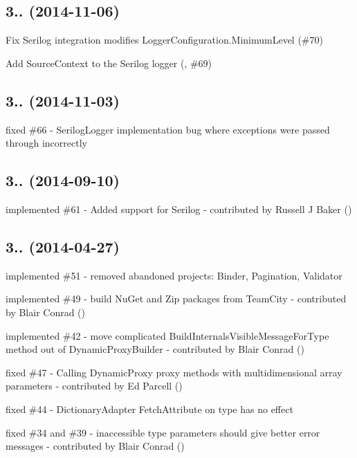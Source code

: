 \subsection*{3.. (2014-\/11-\/06)}


\begin{DoxyItemize}
\item Fix Serilog integration modifies Logger\+Configuration.\+Minimum\+Level (\#70)
\item Add Source\+Context to the Serilog logger (, \#69)
\end{DoxyItemize}

\subsection*{3.. (2014-\/11-\/03)}


\begin{DoxyItemize}
\item fixed \#66 -\/ Serilog\+Logger implementation bug where exceptions were passed through incorrectly
\end{DoxyItemize}

\subsection*{3.. (2014-\/09-\/10)}


\begin{DoxyItemize}
\item implemented \#61 -\/ Added support for Serilog -\/ contributed by Russell J Baker ()
\end{DoxyItemize}

\subsection*{3.. (2014-\/04-\/27)}


\begin{DoxyItemize}
\item implemented \#51 -\/ removed abandoned projects\+: Binder, Pagination, Validator
\item implemented \#49 -\/ build Nu\+Get and Zip packages from Team\+City -\/ contributed by Blair Conrad ()
\item implemented \#42 -\/ move complicated Build\+Internals\+Visible\+Message\+For\+Type method out of Dynamic\+Proxy\+Builder -\/ contributed by Blair Conrad ()
\item fixed \#47 -\/ Calling Dynamic\+Proxy proxy methods with multidimensional array parameters -\/ contributed by Ed Parcell ()
\item fixed \#44 -\/ Dictionary\+Adapter Fetch\+Attribute on type has no effect
\item fixed \#34 and \#39 -\/ inaccessible type parameters should give better error messages -\/ contributed by Blair Conrad ()
\end{DoxyItemize}


